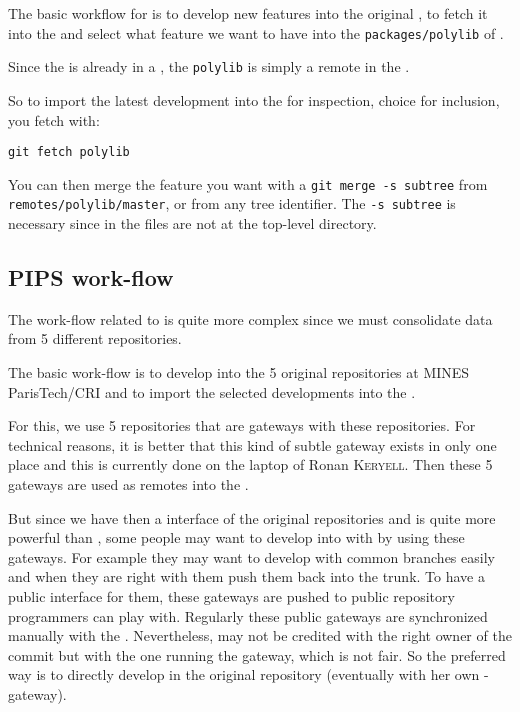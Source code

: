 \documentclass[a4paper]{article}
\begin{document}
The basic workflow for \Apolylib is to develop new features into the
original \Apolylib{} \Agit, to fetch it into the \Apfa{} \Agit and select what
feature we want to have into the \texttt{packages/polylib} of \Apfa.

Since the \Apolylib is already in a \Agit, the \texttt{polylib} is simply
a remote in the \Apfa{} \Agit.

So to import the latest \Apolylib development into the \Apfa{} \Agit for
inspection, choice for inclusion, you fetch \Apolylib with:
\begin{verbatim}
git fetch polylib
\end{verbatim}

You can then merge the feature you want with a \texttt{git merge -s
  subtree} from \texttt{remotes/polylib/master}, or from any tree
identifier. The \texttt{-s subtree} is necessary since in \Apfa the
\Apolylib files are not at the top-level directory.


\subsection{PIPS work-flow}
\label{sec:pips-workflow}

The work-flow related to \Apips is quite more complex since we must
consolidate data from 5 different \Asvn repositories.

The basic \Apips work-flow is to develop into the 5 original \Apips{}
\Asvn repositories at MINES ParisTech/CRI and to import the selected
developments into the \Apfa{} \Agit.

For this, we use 5 \Agit repositories that are gateways with these \Asvn
repositories. For technical reasons, it is better that this kind of subtle
gateway exists in only one place and this is currently done on the laptop
of Ronan \textsc{Keryell}. Then these 5 gateways are used as remotes into
the \Apfa{} \Agit.

But since we have then a \Agit interface of the original \Apips{} \Asvn
repositories and \Agit is quite more powerful than \Asvn, some people may
want to develop into \Apips with \Agit by using these gateways. For
example they may want to develop with common branches easily and when they
are right with them push them back into the \Apips{} \Asvn trunk. To have
a public interface for them, these \Agit gateways are pushed to public
\Agit repository programmers can play with. Regularly these public
gateways are synchronized manually with the \Apips{} \Asvn. Nevertheless,
\Asvn may not be credited with the right owner of the commit but with the
one running the gateway, which is not fair. So the preferred way is to
directly develop in the original \Apips \Asvn repository (eventually with
her own \Agit-\Asvn gateway).
\end{document}
